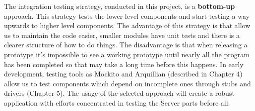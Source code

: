 The integration testing strategy, conducted in this project, is a \textbf{bottom-up} approach. This strategy tests the lower level components and start testing a way upwards to higher level components. The advantage of this strategy is that allow us to maintain the code easier, smaller modules have unit tests and there is a clearer structure of how to do things. The disadvantage is that when releasing a prototype it's impossible to see a working prototype until nearly all the program has been completed so that may take a long time before this happens. In early development, testing tools as Mockito and Arquillian (described in Chapter 4) allow us to test components which depend on incomplete ones through stubs and drivers (Chapter 5). The usage of the selected approach will create a robust application with efforts concentrated in testing the Server parts before all. 
